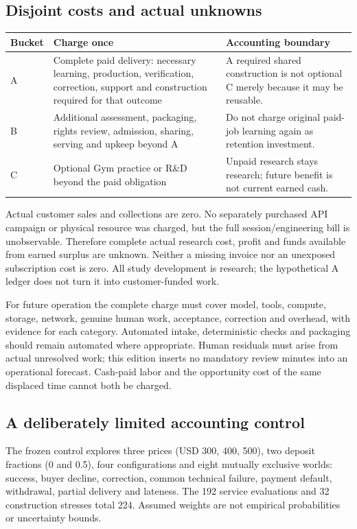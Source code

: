 \documentclass[11pt]{article}
\begin{document}
\subsection{Disjoint costs and actual unknowns}
\begin{tabularx}{\textwidth}{@{}p{14mm}Y Y@{}}
\toprule
Bucket & Charge once & Accounting boundary\\\midrule
A & Complete paid delivery: necessary learning, production, verification, correction, support and construction required for that outcome & A required shared construction is not optional C merely because it may be reusable.\\
B & Additional assessment, packaging, rights review, admission, sharing, serving and upkeep beyond A & Do not charge original paid-job learning again as retention investment.\\
C & Optional Gym practice or R\&D beyond the paid obligation & Unpaid research stays research; future benefit is not current earned cash.\\
\bottomrule
\end{tabularx}

Actual customer sales and collections are zero. No separately purchased API campaign or physical resource was charged, but the full session/engineering bill is unobservable. Therefore complete actual research cost, profit and funds available from earned surplus are unknown. Neither a missing invoice nor an unexposed subscription cost is zero. All study development is research; the hypothetical A ledger does not turn it into customer-funded work.

For future operation the complete charge must cover model, tools, compute, storage, network, genuine human work, acceptance, correction and overhead, with evidence for each category. Automated intake, deterministic checks and packaging should remain automated where appropriate. Human residuals must arise from actual unresolved work; this edition inserts no mandatory review minutes into an operational forecast. Cash-paid labor and the opportunity cost of the same displaced time cannot both be charged.

\subsection{A deliberately limited accounting control}
 The frozen control explores three prices (USD 300, 400, 500), two deposit fractions (0 and 0.5), four configurations and eight mutually exclusive worlds: success, buyer decline, correction, common technical failure, payment default, withdrawal, partial delivery and lateness. The 192 service evaluations and 32 construction stresses total 224. Assumed weights are not empirical probabilities or uncertainty bounds.
\end{document}
